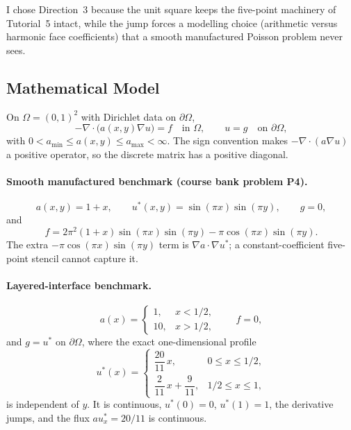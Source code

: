\documentclass[11pt,a4paper]{article}
\begin{document}
I chose Direction~3 because the unit square keeps the five-point machinery of Tutorial~5 intact, while the jump forces a modelling choice (arithmetic versus harmonic face coefficients) that a smooth manufactured Poisson problem never sees.

\subsection{Mathematical Model}
On \(\Omega=(0,1)^2\) with Dirichlet data on \(\partial\Omega\),
\begin{equation}
-\nabla\cdot\bigl(a(x,y)\nabla u\bigr)=f\quad\text{in }\Omega,\qquad
u=g\quad\text{on }\partial\Omega,
\label{eq:pde}
\end{equation}
with \(0<a_{\min}\le a(x,y)\le a_{\max}<\infty\).
The sign convention makes \(-\nabla\cdot(a\nabla u)\) a positive operator, so the discrete matrix has a positive diagonal.

\paragraph{Smooth manufactured benchmark (course bank problem P4).}
\[
a(x,y)=1+x,\qquad
u^*(x,y)=\sin(\pi x)\sin(\pi y),\qquad
g=0,
\]
and
\begin{equation}
f=2\pi^2(1+x)\sin(\pi x)\sin(\pi y)-\pi\cos(\pi x)\sin(\pi y).
\label{eq:f4}
\end{equation}
The extra \(-\pi\cos(\pi x)\sin(\pi y)\) term is \(\nabla a\cdot\nabla u^*\); a constant-coefficient five-point stencil cannot capture it.

\paragraph{Layered-interface benchmark.}
\[
a(x)=\begin{cases}1,&x<1/2,\\10,&x>1/2,\end{cases}
\qquad f=0,
\]
and \(g=u^*\) on \(\partial\Omega\), where the exact one-dimensional profile
\begin{equation}
u^*(x)=\begin{cases}
\dfrac{20}{11}\,x,&0\le x\le 1/2,\\[4pt]
\dfrac{2}{11}\,x+\dfrac{9}{11},&1/2\le x\le 1,
\end{cases}
\label{eq:ulayered}
\end{equation}
is independent of \(y\).
It is continuous, \(u^*(0)=0\), \(u^*(1)=1\), the derivative jumps, and the flux \(a u_x^*=20/11\) is continuous.
\end{document}
